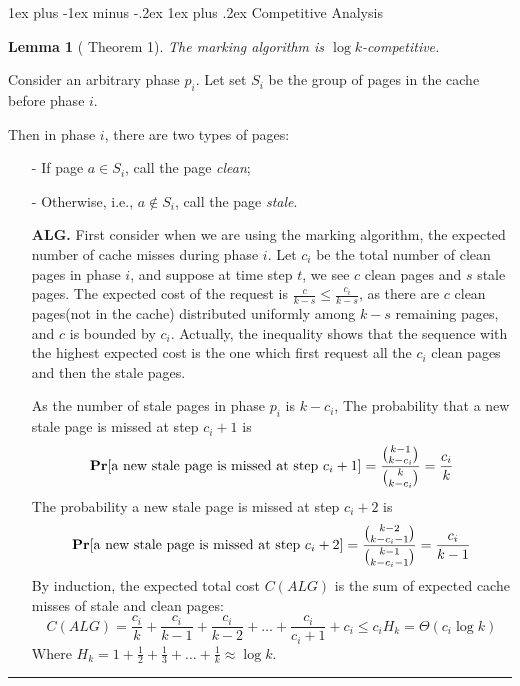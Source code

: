 \documentclass[11pt]{article}
\makeatletter
\renewcommand{\subsection}{\@startsection{subsection}{2}{0mm}%
                                   {1ex plus -1ex minus -.2ex}%
                                   {1ex plus .2ex}%
                                   {\normalfont\large\bfseries}}%
\newenvironment{proof}{{\bf Proof:  }}{\hfill\rule{2mm}{2mm}}
\newtheorem{lemma}[fact]{Lemma}
\newcommand{\prob}[1]{\ensuremath{\text{{\bf Pr}$\left[#1\right]$}}}
\makeatother
\begin{document}
\subsection{Competitive Analysis}
\begin{lemma}[\cite{fiat1991competitive} Theorem 1]
	The marking algorithm is $\log k$-competitive.
\end{lemma}

\begin{proof}
	Consider an arbitrary phase $p_i$. Let set $S_i$ be the group of pages in the cache before phase $i$.
	
	Then in phase $i$, there are two types of pages:
	\begin{enumerate}
		\item[-] If page $a\in S_i$, call the page {\em clean};
		\item[-] Otherwise, i.e., $a\notin S_i$, call the page {\em stale}.
	\end{enumerate}

	 
	
	\begin{enumerate}[itemindent=1em]
		\item [{\bf ALG. }] First consider when we are using the marking algorithm, the expected number of cache misses during phase $i$. Let $c_i$ be the total number of clean pages in phase $i$, and suppose at time step $t$, we see $c$ clean pages and $s$ stale pages. The expected cost of the request is $\frac{c}{k-s}\le \frac{c_i}{k-s}$, as there are $c$ clean pages(not in the cache) distributed uniformly among $k-s$ remaining pages, and $c$ is bounded by $c_i$. Actually, the inequality shows that the sequence with the highest expected cost is the one which first request all the $c_i$ clean pages and then the stale pages. 
		
		As the number of stale pages in phase $p_i$ is $k-c_i$, The probability that a new stale page is missed at step $c_i+1$ is 
		$$\prob{\text{a new stale page is missed at step $c_i+1$}}=\frac{\binom{k-1}{k-c_i}}{\binom{k}{k-c_i}}=\frac{c_i}{k}$$
		The probability a new stale page is missed at step $c_i+2$ is
		$$\prob{\text{a new stale page is missed at step $c_i+2$}}=\frac{\binom{k-2}{k-c_i-1}}{\binom{k-1}{k-c_i-1}}=\frac{c_i}{k-1}$$
		By induction, the expected total cost $C(ALG)$ is the sum of expected cache misses of stale and clean pages:
		$$C(ALG)=\frac{c_i}{k}+\frac{c_i}{k-1}+\frac{c_i}{k-2}+\dots+\frac{c_i}{c_i+1}+c_i\le c_iH_k=\Theta(c_i\log k)$$
		Where $H_k=1+\frac{1}{2} + \frac{1}{3} + \dots + \frac{1}{k}\approx\log k$.
		

\end{enumerate}
\end{proof}
\end{document}
